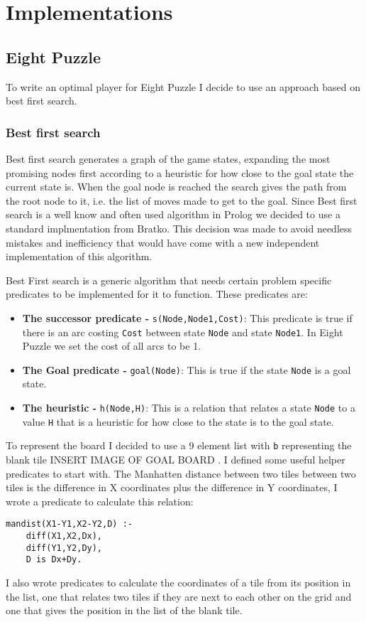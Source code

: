\documentclass[a4paper,12pt]{report}
\begin{document}
\chapter{Implementations}
\section{Eight Puzzle}
To write an optimal player for Eight Puzzle I decide to use an approach based on best first search.
\subsection{Best first search}
Best first search generates a graph of the game states, expanding the most promising nodes first according to a heuristic for how close to the goal state the current state is. When the goal node is reached the search gives the path from the root node to it, i.e. the list of moves made to get to the goal.
Since Best first search is a well know and often used algorithm in Prolog we decided to use a standard implmentation from Bratko\cite{Bratko}. This decision was made to avoid needless mistakes and inefficiency that would have come with a new independent implementation of this algorithm.

Best First search is a generic algorithm that needs certain problem specific predicates to be implemented for it to function. These predicates are:
\begin{itemize}
\item \textbf{The successor predicate - }\texttt{s(Node,Node1,Cost)}: This predicate is true if there is an arc costing \texttt{Cost} between state \texttt{Node} and state \texttt{Node1}. In Eight Puzzle we set the cost of all arcs to be 1.
\item \textbf{The Goal predicate - }\texttt{goal(Node)}: This is true if the state \texttt{Node} is a goal state.
\item \textbf{The heuristic - }\texttt{h(Node,H)}: This is a relation that relates a state \texttt{Node} to a value \texttt{H} that is a heuristic for how close to the state is to the goal state.
\end{itemize}
To represent the board I decided to use a 9 element list with \texttt{b} representing the blank tile INSERT IMAGE OF GOAL BOARD .
I defined some useful helper predicates to start with. The Manhatten distance between two tiles between two tiles is the difference in X coordinates plus the difference in Y coordinates, I wrote a predicate to calculate this relation:
\begin{verbatim}
mandist(X1-Y1,X2-Y2,D) :-
    diff(X1,X2,Dx),
    diff(Y1,Y2,Dy),
    D is Dx+Dy.
\end{verbatim}
I also wrote predicates to calculate the coordinates of a tile from its position in the list, one that relates two tiles if they are next to each other on the grid and one that gives the position in the list of the blank tile.
\end{document}
